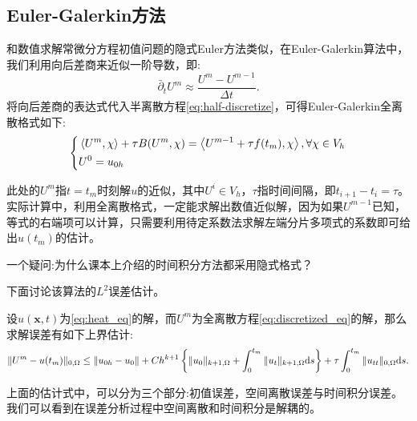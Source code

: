 \subsection{Euler-Galerkin方法}
和数值求解常微分方程初值问题的隐式Euler方法类似，在Euler-Galerkin算法中，我们利用向后差商来近似一阶导数，即:
\begin{equation}
    \bar{\partial}_{t}U^{m}\approx\frac{U^{m}-U^{m-1}}{\Delta t}.
\end{equation}
将向后差商的表达式代入半离散方程\eqref{eq:half-discretize}，可得Euler-Galerkin全离散格式如下:
\begin{equation}
    \label{eq:discretized_eq}
    \left\{
        \begin{aligned}
            &\left<U^{m},\chi\right>+\tau B(U^{m},\chi)=\left<U^{m-1}+\tau f(t_{m}),\chi\right>,\forall \chi\in V_{h}\\
            &U^{0}=u_{0h}\\
        \end{aligned}
    \right.
\end{equation}
\begin{remark}
    此处的$U^{m}$指$t=t_{m}$时刻解$u$的近似，其中$U^{i}\in V_{h}$，$\tau$指时间间隔，即$t_{i+1}-t_{i}=\tau$。实际计算中，利用全离散格式，一定能求解出数值近似解，因为如果$U^{m-1}$已知，等式的右端项可以计算，只需要利用待定系数法求解左端分片多项式的系数即可给出$u(t_{m})$的估计。
\end{remark}
\begin{remark}
    一个疑问:为什么课本上介绍的时间积分方法都采用隐式格式？
\end{remark}
下面讨论该算法的$L^{2}$误差估计。
\begin{theorem}
    设$u(\mathbf{x},t)$为\eqref{eq:heat_eq}的解，而$U^{m}$为全离散方程\eqref{eq:discretized_eq}的解，那么求解误差有如下上界估计:
    \begin{equation}
        \|U^{m}-u(t_{m})\|_{0,\Omega}\le\|u_{0h}-u_{0}\|+Ch^{k+1}\left\{\|u_{0}\|_{k+1,\Omega}+\int_{0}^{t_{m}}\|u_{t}\|_{k+1,\Omega}\mathrm{d} s\right\}+\tau\int_{0}^{t_{m}}\|u_{tt}\|_{0,\Omega}\mathrm{d} s.
    \end{equation}
\end{theorem}
\begin{remark}
    上面的估计式中，可以分为三个部分:初值误差，空间离散误差与时间积分误差。我们可以看到在误差分析过程中空间离散和时间积分是解耦的。
\end{remark}

